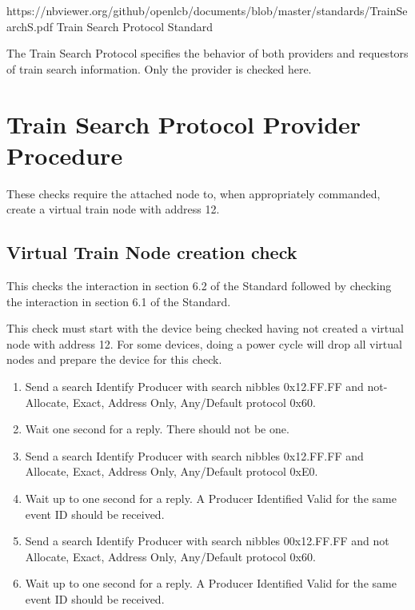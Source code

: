 



\maketitle
\thispagestyle{firststyle}

\introductionCaveats
    {https://nbviewer.org/github/openlcb/documents/blob/master/standards/TrainSearchS.pdf}
    {Train Search Protocol Standard}

The Train Search Protocol specifies the behavior of both providers and requestors of 
train search information.  Only the provider is checked here.


\section{Train Search Protocol Provider Procedure}


These checks require the attached node to, when appropriately commanded,
create a virtual train node with address 12.

\subsection{Virtual Train Node creation check}

This checks the interaction in section 6.2 of the Standard
followed by checking the interaction in section 6.1 of the Standard.

This check must start with the device being checked having not created a
virtual node with address 12. For some devices, doing a power cycle will 
drop all virtual nodes and prepare the device for this check.

\begin{enumerate}

\item Send a search Identify Producer with search nibbles 0x12.FF.FF and 
    not-Allocate, Exact, Address Only, Any/Default protocol 0x60.
    
\item Wait one second for a reply.  There should not be one.

\item Send a search Identify Producer with search nibbles 0x12.FF.FF and 
    Allocate, Exact, Address Only, Any/Default protocol 0xE0.

\item Wait up to one second for a reply.  A Producer Identified Valid for the same event ID
    should be received.

\item Send a search Identify Producer with search nibbles 00x12.FF.FF and 
    not Allocate, Exact, Address Only, Any/Default protocol 0x60.

\item Wait up to one second for a reply.  A Producer Identified Valid for the same event ID
    should be received.    

\end{enumerate}

